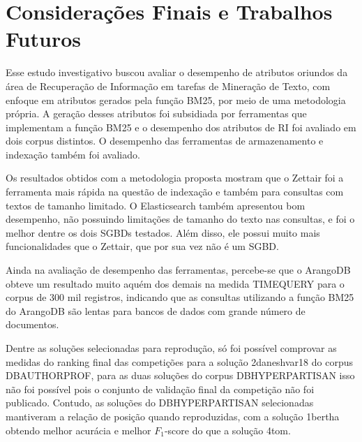 \chapter{Considerações Finais e Trabalhos Futuros} \label{ch:ConsideraçõesFinais}

Esse estudo investigativo buscou avaliar o desempenho de atributos oriundos da área de Recuperação de Informação em tarefas de Mineração de Texto, com enfoque em atributos gerados pela função BM25, por meio de uma metodologia própria.
A geração desses atributos foi subsidiada por ferramentas que implementam a função BM25 e o desempenho dos atributos de RI foi avaliado em dois corpus distintos.
O desempenho das ferramentas de armazenamento e indexação também foi avaliado.
 
Os resultados obtidos com a metodologia proposta mostram que o Zettair foi a ferramenta mais rápida na questão de indexação e também para consultas com textos de tamanho limitado.
O Elasticsearch também apresentou bom desempenho, não possuindo limitações de tamanho do texto nas consultas, e foi o melhor dentre os dois SGBDs testados.
Além disso, ele possui muito mais funcionalidades que o Zettair, que por sua vez não é um SGBD.

Ainda na avaliação de desempenho das ferramentas, percebe-se que o ArangoDB obteve um resultado muito aquém dos demais na medida TIME\underscore{}QUERY para o corpus de 300 mil registros, indicando que as consultas utilizando a função BM25 do ArangoDB são lentas para bancos de dados com grande número de documentos.

Dentre as soluções selecionadas para reprodução, só foi possível comprovar as medidas do ranking final das competições para a solução 2\underscore{}daneshvar18 do corpus DB\underscore{}AUTHORPROF, para as duas soluções do corpus DB\underscore{}HYPERPARTISAN isso não foi possível pois o conjunto de validação final da competição não foi publicado.
Contudo, as soluções do DB\underscore{}HYPERPARTISAN selecionadas mantiveram a relação de posição quando reproduzidas, com a solução 1\underscore{}bertha obtendo melhor acurácia e melhor $F_1$-score do que a solução 4\underscore{}tom.

